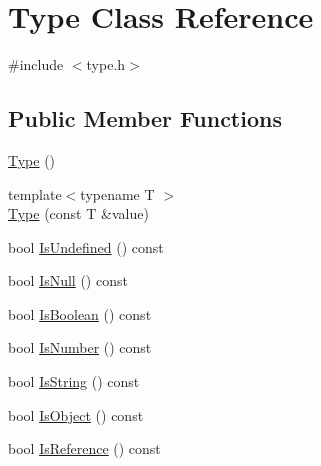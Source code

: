 \hypertarget{class_type}{}\section{Type Class Reference}
\label{class_type}


{\ttfamily \#include $<$type.\+h$>$}

\subsection*{Public Member Functions}
\begin{DoxyCompactItemize}
\item 
\hyperlink{class_type_a78339313d36891f18427c431ea84e306}{Type} ()
\item 
{\footnotesize template$<$typename T $>$ }\\\hyperlink{class_type_aba2b55a99317139e0e5b272695b34a2b}{Type} (const T \&value)
\item 
bool \hyperlink{class_type_aaa2f4f96dd01eb3fd832f9a5e1d57615}{Is\+Undefined} () const
\item 
bool \hyperlink{class_type_a8d7b724a3acd08a8f7f2bb9af48280e3}{Is\+Null} () const
\item 
bool \hyperlink{class_type_ae6f13d051ad6e6bef19f2501b6d4405d}{Is\+Boolean} () const
\item 
bool \hyperlink{class_type_a66a75ac94e749abc366ea9a6a4a1c35f}{Is\+Number} () const
\item 
bool \hyperlink{class_type_a0deae255e3c14229999eba05ad9f8e64}{Is\+String} () const
\item 
bool \hyperlink{class_type_abbc365cac181652bdeb3c04bdaffea29}{Is\+Object} () const
\item 
bool \hyperlink{class_type_af8cf2c61d621a1fe279c7be850158906}{Is\+Reference} () const
\end{DoxyCompactItemize}
